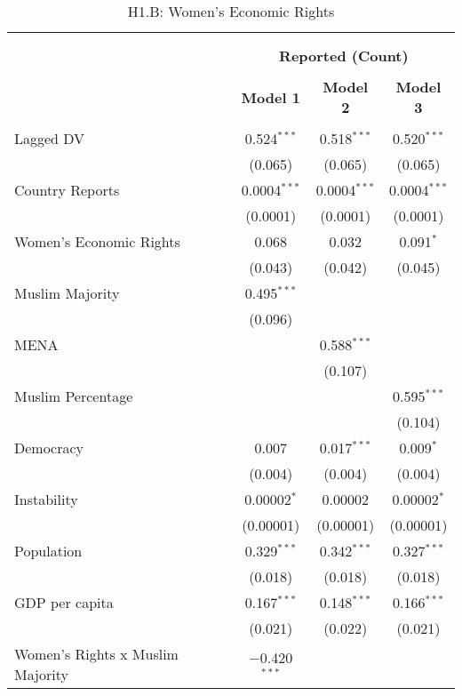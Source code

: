 
\begin{table}[!htbp] \centering 
  \caption{H1.B: Women's Economic Rights} 
  \label{} 
\begin{tabular}{@{\extracolsep{5pt}}lccc} 
\\[-1.8ex]\hline \\[-1.8ex] 
\\[-1.8ex] & \multicolumn{3}{c}{\textbf{Reported (Count)}} \\ 
\\[-1.8ex] & \textbf{Model 1} & \textbf{Model 2} & \textbf{Model 3}\\ 
\hline \\[-1.8ex] 
 Lagged DV & 0.524$^{***}$ & 0.518$^{***}$ & 0.520$^{***}$ \\ 
  & (0.065) & (0.065) & (0.065) \\ 
  Country Reports & 0.0004$^{***}$ & 0.0004$^{***}$ & 0.0004$^{***}$ \\ 
  & (0.0001) & (0.0001) & (0.0001) \\ 
  Women's Economic Rights & 0.068 & 0.032 & 0.091$^{*}$ \\ 
  & (0.043) & (0.042) & (0.045) \\ 
  Muslim Majority & 0.495$^{***}$ &  &  \\ 
  & (0.096) &  &  \\ 
  MENA &  & 0.588$^{***}$ &  \\ 
  &  & (0.107) &  \\ 
  Muslim Percentage &  &  & 0.595$^{***}$ \\ 
  &  &  & (0.104) \\ 
  Democracy & 0.007 & 0.017$^{***}$ & 0.009$^{*}$ \\ 
  & (0.004) & (0.004) & (0.004) \\ 
  Instability & 0.00002$^{*}$ & 0.00002 & 0.00002$^{*}$ \\ 
  & (0.00001) & (0.00001) & (0.00001) \\ 
  Population & 0.329$^{***}$ & 0.342$^{***}$ & 0.327$^{***}$ \\ 
  & (0.018) & (0.018) & (0.018) \\ 
  GDP per capita & 0.167$^{***}$ & 0.148$^{***}$ & 0.166$^{***}$ \\ 
  & (0.021) & (0.022) & (0.021) \\ 
  Women's Rights x Muslim Majority & $-$0.420$^{***}$ &  &  \\ 

\end{tabular}
\end{table}
